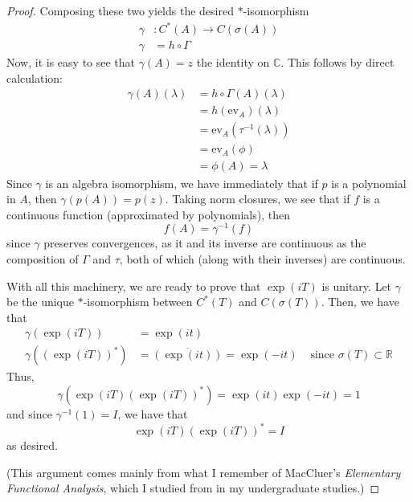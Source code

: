 \documentclass[fontsize=11pt]{scrartcl} %
\numberwithin{equation}{section} %
\numberwithin{figure}{section} %
\numberwithin{table}{section} %
\newcommand{\R}{\mathbb{R}}
\newcommand{\C}{\mathbb{C}}
\begin{document}
\begin{proof}
    Composing these two yields the desired $*$-isomorphism
    \[
        \begin{aligned}
    \gamma&:C^*(A)\to C(\sigma(A))\\
    \gamma &= h\circ \Gamma
\end{aligned}
    \]
    Now, it is easy to see that $\gamma(A) = z$ the identity on $\C$. This
    follows by direct calculation:
    \[
        \begin{aligned}
            \gamma(A)(\lambda) &= h\circ\Gamma(A)(\lambda)\\
            &= h(\text{ev}_A)(\lambda)\\
            &= \text{ev}_A(\tau^{-1}(\lambda))\\
            &= \text{ev}_A(\phi)\\
            &=\phi(A) = \lambda
    \end{aligned}
    \]
    Since $\gamma$ is an algebra isomorphism, we have immediately that if $p$ is
    a polynomial in $A$, then $\gamma(p(A)) = p(z)$. Taking norm closures, we see
    that if $f$ is a continuous function (approximated by polynomials), then
    \[
        f(A) = \gamma^{-1}(f)
    \]
    since $\gamma$ preserves convergences, as it and its inverse are continuous
    as the composition of $\Gamma$ and $\tau$, both of which (along with their
    inverses) are continuous.


    With all this machinery, we are ready to prove that $\exp(iT)$ is unitary.
    Let $\gamma$ be the unique $*$-isomorphism between $C^*(T)$ and
    $C(\sigma(T))$. Then, we have that
    \[
        \begin{aligned}
        \gamma(\exp(iT)) &= \exp(it)\\
        \gamma((\exp(iT))^*) &= \overline{(\exp(it))}=\exp(-it) &\text{ since
        $\sigma(T)\subset \R$}
    \end{aligned}
    \]
    Thus,
    \[
        \gamma(\exp(iT)(\exp(iT))^*) = \exp(it)\exp(-it) = 1
    \]
    and since $\gamma^{-1}(1)=I$, we have that
    \[
        \exp(iT)(\exp(iT))^* = I
    \]
    as desired.

    (This argument comes mainly from what I remember of MacCluer's {\em
        Elementary Functional Analysis}, which I studied from in my
    undergraduate studies.)
\end{proof}

\newpage
\end{document}
